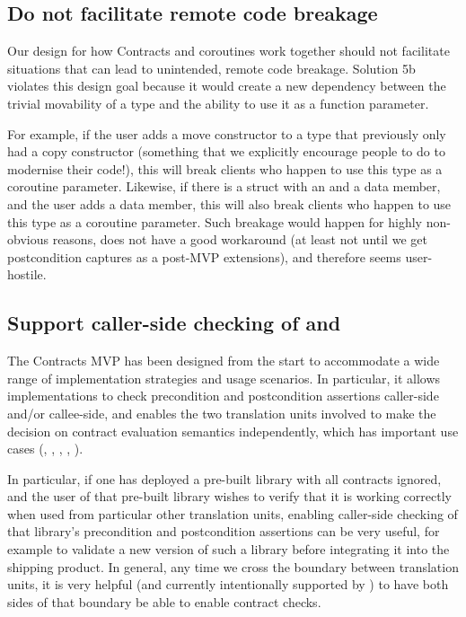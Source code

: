 \subsection{Do not facilitate remote code breakage}

Our design for how Contracts and coroutines work together should not facilitate situations that can lead to unintended, remote code breakage. Solution 5b violates this design goal because it would create a new dependency between the trivial movability of a type and the ability to use it as a function parameter.

For example, if the user adds a move constructor to a type that previously only had a copy constructor (something that we explicitly encourage people to do to modernise their code!), this will break clients who happen to use this type as a coroutine parameter. Likewise, if there is a struct with an  and a  data member, and the user adds a  data member, this will also break clients who happen to use this type as a coroutine parameter. Such breakage would happen for highly non-obvious reasons, does not have a good workaround (at least not until we get postcondition captures as a post-MVP extensions), and therefore seems user-hostile.

\subsection{Support caller-side checking of  and }

The Contracts MVP has been designed from the start to accommodate a wide range of implementation strategies and usage scenarios. In particular, it allows implementations to check precondition and postcondition assertions caller-side and/or callee-side, and enables the two translation units involved to make the decision on contract evaluation semantics independently, which has important use cases (\cite{P2751R1}, \cite{P3228R1}, \cite{P3119R1}, \cite{P3267R1}, \cite{P3321R0}).

In particular, if one has deployed a pre-built library with all contracts ignored, and the user of that pre-built library wishes to verify that it is working correctly when used from particular other translation units, enabling caller-side checking of that library's precondition and postcondition assertions can be very useful, for example to validate a new version of such a library before integrating it into the shipping product. In general, any time we cross the boundary between translation units, it is very helpful (and currently intentionally supported by \cite{P2900R8}) to have both sides of that boundary be able to enable contract checks.

